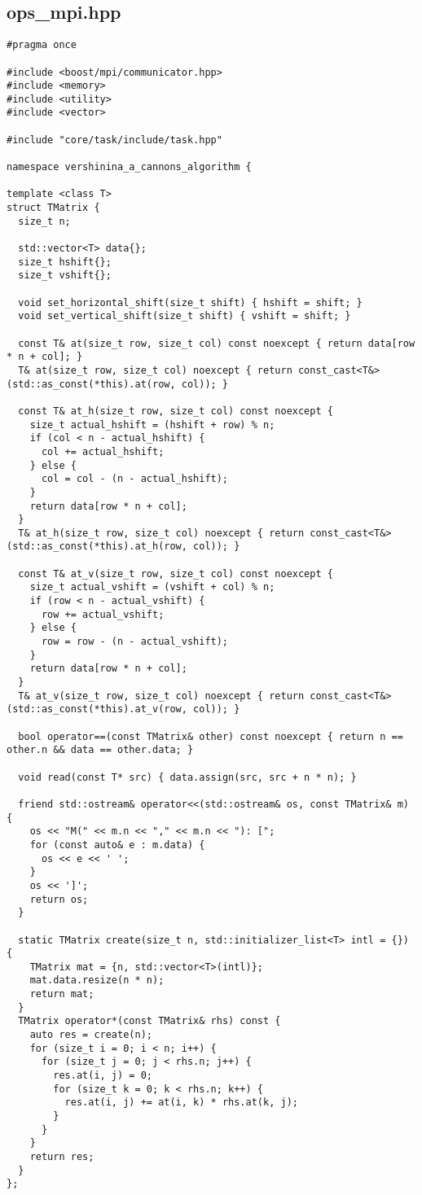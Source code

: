 \documentclass[12pt]{article}
\begin{document}
\subsection{ops\_mpi.hpp}
\begin{lstlisting}
#pragma once

#include <boost/mpi/communicator.hpp>
#include <memory>
#include <utility>
#include <vector>

#include "core/task/include/task.hpp"

namespace vershinina_a_cannons_algorithm {

template <class T>
struct TMatrix {
  size_t n;

  std::vector<T> data{};
  size_t hshift{};
  size_t vshift{};

  void set_horizontal_shift(size_t shift) { hshift = shift; }
  void set_vertical_shift(size_t shift) { vshift = shift; }

  const T& at(size_t row, size_t col) const noexcept { return data[row * n + col]; }
  T& at(size_t row, size_t col) noexcept { return const_cast<T&>(std::as_const(*this).at(row, col)); }

  const T& at_h(size_t row, size_t col) const noexcept {
    size_t actual_hshift = (hshift + row) % n;
    if (col < n - actual_hshift) {
      col += actual_hshift;
    } else {
      col = col - (n - actual_hshift);
    }
    return data[row * n + col];
  }
  T& at_h(size_t row, size_t col) noexcept { return const_cast<T&>(std::as_const(*this).at_h(row, col)); }

  const T& at_v(size_t row, size_t col) const noexcept {
    size_t actual_vshift = (vshift + col) % n;
    if (row < n - actual_vshift) {
      row += actual_vshift;
    } else {
      row = row - (n - actual_vshift);
    }
    return data[row * n + col];
  }
  T& at_v(size_t row, size_t col) noexcept { return const_cast<T&>(std::as_const(*this).at_v(row, col)); }

  bool operator==(const TMatrix& other) const noexcept { return n == other.n && data == other.data; }

  void read(const T* src) { data.assign(src, src + n * n); }

  friend std::ostream& operator<<(std::ostream& os, const TMatrix& m) {
    os << "M(" << m.n << "," << m.n << "): [";
    for (const auto& e : m.data) {
      os << e << ' ';
    }
    os << ']';
    return os;
  }

  static TMatrix create(size_t n, std::initializer_list<T> intl = {}) {
    TMatrix mat = {n, std::vector<T>(intl)};
    mat.data.resize(n * n);
    return mat;
  }
  TMatrix operator*(const TMatrix& rhs) const {
    auto res = create(n);
    for (size_t i = 0; i < n; i++) {
      for (size_t j = 0; j < rhs.n; j++) {
        res.at(i, j) = 0;
        for (size_t k = 0; k < rhs.n; k++) {
          res.at(i, j) += at(i, k) * rhs.at(k, j);
        }
      }
    }
    return res;
  }
};


\end{lstlisting}
\end{document}
